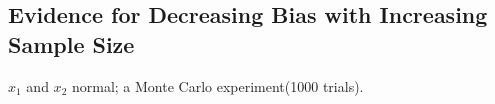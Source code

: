 \documentclass[a4paper]{article}
\begin{document}
\subsection{Evidence for Decreasing Bias with Increasing Sample Size}
\begin{table}[H]
\caption {Bias Change for Various Sample Sizes} \label{tab:bias change}

$x_1$ and $x_2$ normal; a Monte Carlo experiment(1000 trials).
\centering
{}
\end{table}
\end{document}
